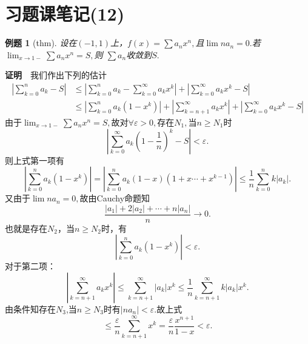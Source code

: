 \documentclass[UTF8]{article}
\newcommand{\zm}{\textbf{证明}$\quad$}
\newtheorem{exa}{\hspace{2em}例题}[section]
\begin{document}
  \clearpage
  \section{习题课笔记(12)}
  \begin{exa}[thm]
    设在$(-1,1)$上，$f(x)=\sum a_nx^n,$且$\lim na_n=0.$若$\lim_{x\to1-}\sum a_nx^n=S,$则
    $\sum a_n$收敛到$S.$
  \end{exa}
  \zm 我们作出下列的估计
  \begin{align*}
    \left|\sum_{k=0}^na_k-S\right|&\le\left|\sum_{k=0}^na_k-\sum_{k=0}^\infty a_kx^k\right|+
    \left|\sum_{k=0}^\infty a_kx^k-S\right|\\
    &\le\left|\sum_{k=0}^na_k(1-x^k)\right|+\left|\sum_{k=n+1}^\infty a_kx^k\right|+\left|\sum_{k=0}^\infty a_kx^k-S\right|
  \end{align*}
  由于$\lim_{x\to1-}\sum a_nx^n=S,$故对$\forall\varepsilon>0,$存在$N_1,$当$n\ge N_1$时
  $$\left|\sum_{k=0}^\infty a_k(1-\frac{1}{n})^k-S\right|<\varepsilon.$$
  则上式第一项有
  $$\left|\sum_{k=0}^na_k(1-x^k)\right|=\left|\sum_{k=0}^na_k(1-x)(1+x\cdots+x^{k-1})\right|\le
  \frac{1}{n}\sum_{k=0}^nk|a_k|.$$
  又由于$\lim na_n=0,$故由Cauchy命题知
  $$\frac{|a_1|+2|a_2|+\cdots+n|a_n|}{n}\to0.$$
  也就是存在$N_2$，当$n\ge N_2$时，有
  $$\left|\sum_{k=0}^na_k(1-x^k)\right|<\varepsilon.$$
  对于第二项：
  $$\left|\sum_{k=n+1}^\infty a_kx^k\right|\le\sum_{k=n+1}^\infty|a_k|x^k\le\frac{1}{n}\sum_{k=n+1}^\infty
  k|a_k|x^k.$$
  由条件知存在$N_3$,当$n\ge N_3$时有$|na_n|<\varepsilon.$故上式
  $$\le\frac{\varepsilon}{n}\sum_{k=n+1}^\infty x^k=\frac{\varepsilon}{n}\frac{x^{n+1}}{1-x}<\varepsilon.$$
\end{document}
